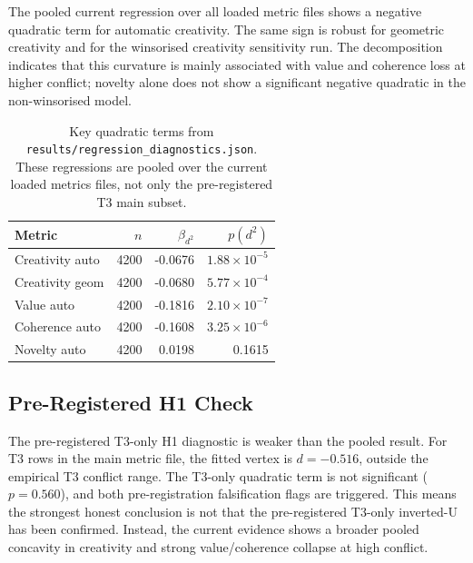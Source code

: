 \documentclass[sigconf,nonacm]{acmart}
\begin{document}
The pooled current regression over all loaded metric files shows a negative quadratic term for automatic creativity.
The same sign is robust for geometric creativity and for the winsorised creativity sensitivity run.
The decomposition indicates that this curvature is mainly associated with value and coherence loss at higher conflict; novelty alone does not show a significant negative quadratic in the non-winsorised model.

\begin{table}[t]
\centering
\small
\begin{tabular}{lrrr}
\toprule
Metric & $n$ & $\beta_{d^2}$ & $p(d^2)$ \\
\midrule
Creativity auto & 4200 & -0.0676 & $1.88{\times}10^{-5}$ \\
Creativity geom & 4200 & -0.0680 & $5.77{\times}10^{-4}$ \\
Value auto & 4200 & -0.1816 & $2.10{\times}10^{-7}$ \\
Coherence auto & 4200 & -0.1608 & $3.25{\times}10^{-6}$ \\
Novelty auto & 4200 & 0.0198 & 0.1615 \\
\bottomrule
\end{tabular}
\caption{Key quadratic terms from \texttt{results/regression\_diagnostics.json}. These regressions are pooled over the current loaded metrics files, not only the pre-registered T3 main subset.}
\label{tab:quadratic}
\end{table}

\subsection{Pre-Registered H1 Check}

The pre-registered T3-only H1 diagnostic is weaker than the pooled result.
For T3 rows in the main metric file, the fitted vertex is $d=-0.516$, outside the empirical T3 conflict range.
The T3-only quadratic term is not significant ($p=0.560$), and both pre-registration falsification flags are triggered.
This means the strongest honest conclusion is not that the pre-registered T3-only inverted-U has been confirmed.
Instead, the current evidence shows a broader pooled concavity in creativity and strong value/coherence collapse at high conflict.
\end{document}
